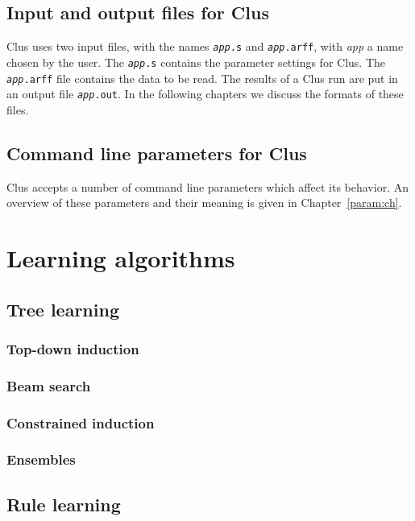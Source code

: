 \documentclass[a4paper]{report}
\begin{document}
\section{Input and output files for Clus}

Clus uses two input files, with the names {\tt {\em app}.s} and {\tt {\em app}.arff}, with {\em app} a name chosen by the user.  The {\tt {\em app}.s} contains the parameter settings for Clus.  The {\tt {\em app}.arff} file contains the data to be read.  The results of a Clus run are put in an output file {\tt {\em app}.out}.  In the following chapters we discuss the formats of these files.

\section{Command line parameters for Clus}

Clus accepts a number of command line parameters which affect its behavior.  An overview of these parameters and their meaning is given in Chapter~\ref{param:ch}.

\chapter{Learning algorithms}

\section{Tree learning}

\subsection{Top-down induction}

\subsection{Beam search}

\subsection{Constrained induction}

\subsection{Ensembles}

\section{Rule learning}
\end{document}
